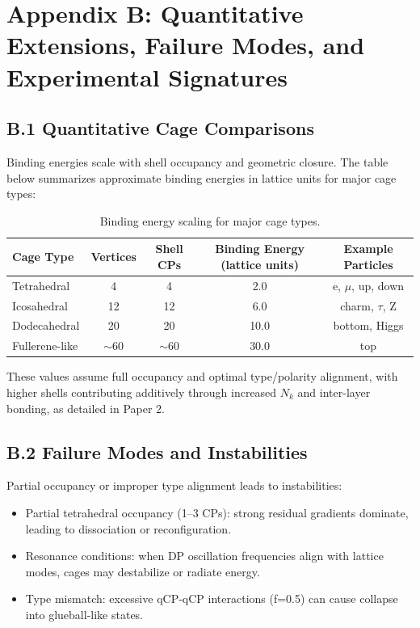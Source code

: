 \documentclass[11pt]{article}
\begin{document}
\section{Appendix B: Quantitative Extensions, Failure Modes, and Experimental Signatures}

\subsection{B.1 Quantitative Cage Comparisons}

Binding energies scale with shell occupancy and geometric closure. The table below summarizes approximate binding energies in lattice units for major cage types:

\begin{table}[h]
\centering
\begin{tabular}{lcccc}
\toprule
Cage Type & Vertices & Shell CPs & Binding Energy (lattice units) & Example Particles \\
\midrule
Tetrahedral & 4 & 4 & 2.0 & e, $\mu$, up, down \\
Icosahedral & 12 & 12 & 6.0 & charm, $\tau$, Z \\
Dodecahedral & 20 & 20 & 10.0 & bottom, Higgs \\
Fullerene-like & $\sim$60 & $\sim$60 & 30.0 & top \\
\bottomrule
\end{tabular}
\caption{Binding energy scaling for major cage types.}
\label{tab:cage_binding}
\end{table}

These values assume full occupancy and optimal type/polarity alignment, with higher shells contributing additively through increased $N_k$ and inter-layer bonding, as detailed in Paper 2.

\subsection{B.2 Failure Modes and Instabilities}

Partial occupancy or improper type alignment leads to instabilities:

\begin{itemize}
\item Partial tetrahedral occupancy (1–3 CPs): strong residual gradients dominate, leading to dissociation or reconfiguration.
\item Resonance conditions: when DP oscillation frequencies align with lattice modes, cages may destabilize or radiate energy.
\item Type mismatch: excessive qCP-qCP interactions (f=0.5) can cause collapse into glueball-like states.
\end{itemize}
\end{document}
